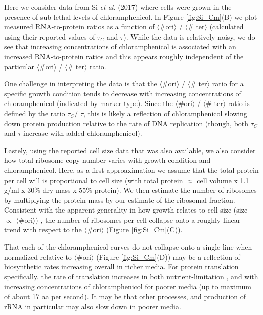 Here we consider data from Si \textit{et al.} (2017) where cells were grown in
the presence of sub-lethal levels of chloramphenicol. In Figure \ref{fig:Si_Cm}(B) we
plot measured RNA-to-protein ratios as a function of $\langle$\#ori$\rangle$ /
$\langle$\# ter$\rangle$ (calculated using their reported values of $\tau_C$ and
$\tau$). While the data is relatively noisy, we do see that
increasing concentrations of chloramphenicol is associated with an increased
RNA-to-protein ratios and this appears roughly independent of the particular
$\langle$\#ori$\rangle$ / $\langle$\# ter$\rangle$ ratio.

One challenge in interpreting the data is that the $\langle$\#ori$\rangle$ /
$\langle$\# ter$\rangle$ ratio for a specific growth condition tends to decrease
with increasing concentrations of chloramphenicol (indicated by marker type).
Since the $\langle$\#ori$\rangle$ / $\langle$\# ter$\rangle$ ratio is defined by
the ratio $\tau_C$/ $\tau$, this is likely a reflection of chloramphenicol
slowing down protein production relative to the rate of DNA replication (though,
both $\tau_C$ and $\tau$ increase with added chloramphenicol).

Lastely, using the reported cell size data that was also available, we also
consider how total ribosome copy number varies with growth condition and
chloramphenicol. Here, as a first approaximation we assume that the total
protein per cell will is proportional to cell size (with total protein $\approx$
cell volume x 1.1 g/ml x 30\% dry mass x 55\% protein). We then estimate the
number of ribosomes by multiplying the protein mass by our estimate of the
ribosomal fraction.  Consistent with the apparent generality in how growth
relates to cell size (size $\propto$ $\langle$\#ori$\rangle$) \citep{si2017},
the number of ribosomes per cell collapse  onto a roughly linear trend with
respect to the  $\langle$\#ori$\rangle$ (Figure \ref{fig:Si_Cm}(C)).

That each of the chloramphenicol curves do not collapse onto a single line when
normalized relative to $\langle$\#ori$\rangle$ (Figure \ref{fig:Si_Cm}(D))
may be a reflection of biosynthetic rates increasing overall in richer media.
For protein translation specifically, the rate of translation increases in both
nutrient-limitation \citep{scott2010}, and with increasing concentrations of
chloramphenicol \citep{dai2016} for poorer media (up to maximum of about 17 aa
per second). It may be that other processes, and production of rRNA in
particular may also slow down in poorer media.

